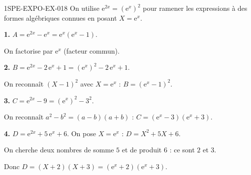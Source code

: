 \begin{corrige}{1SPE-EXPO-EX-018}
On utilise $\mathrm{e}^{2x} = \left(\mathrm{e}^x\right)^2$ pour ramener les expressions à des formes algébriques connues en posant $X = \mathrm{e}^x$.

\textbf{1.} $A = \mathrm{e}^{2x} - \mathrm{e}^x = \mathrm{e}^x\left(\mathrm{e}^x - 1\right)$.

On factorise par $\mathrm{e}^x$ (facteur commun).

\textbf{2.} $B = \mathrm{e}^{2x} - 2\,\mathrm{e}^x + 1 = \left(\mathrm{e}^x\right)^2 - 2\,\mathrm{e}^x + 1$.

On reconnaît $(X-1)^2$ avec $X = \mathrm{e}^x$ : $B = \left(\mathrm{e}^x - 1\right)^2$.

\textbf{3.} $C = \mathrm{e}^{2x} - 9 = \left(\mathrm{e}^x\right)^2 - 3^2$.

On reconnaît $a^2 - b^2 = (a-b)(a+b)$ : $C = \left(\mathrm{e}^x - 3\right)\left(\mathrm{e}^x + 3\right)$.

\textbf{4.} $D = \mathrm{e}^{2x} + 5\,\mathrm{e}^x + 6$. On pose $X = \mathrm{e}^x$ : $D = X^2 + 5X + 6$.

On cherche deux nombres de somme $5$ et de produit $6$ : ce sont $2$ et $3$.

Donc $D = (X+2)(X+3) = \left(\mathrm{e}^x + 2\right)\left(\mathrm{e}^x + 3\right)$.
\end{corrige}
